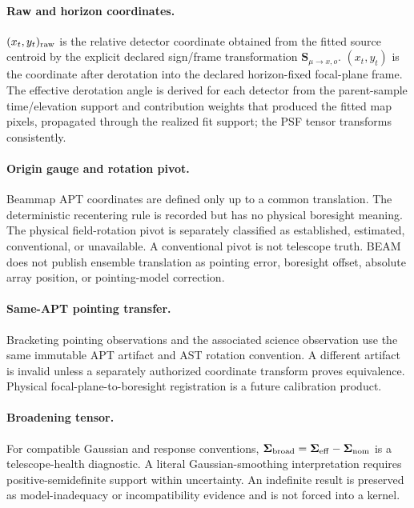 \paragraph{Raw and horizon coordinates.} $(x_t,y_t)_{\rm raw}$ is the relative
detector coordinate obtained from the fitted source centroid by the explicit
declared sign/frame transformation
$\mathbf S_{\mu\rightarrow x,o}$. $(x_t,y_t)$ is the coordinate after
derotation into the declared horizon-fixed focal-plane frame. The effective
derotation angle is derived for each detector from the parent-sample
time/elevation support and contribution weights that produced the fitted map
pixels, propagated through the realized fit support; the PSF tensor transforms
consistently.

\paragraph{Origin gauge and rotation pivot.} Beammap APT coordinates are
defined only up to a common translation. The deterministic recentering rule is
recorded but has no physical boresight meaning. The physical field-rotation
pivot is separately classified as established, estimated, conventional, or
unavailable. A conventional pivot is not telescope truth. BEAM does not
publish ensemble translation as pointing error, boresight offset, absolute
array position, or pointing-model correction.

\paragraph{Same-APT pointing transfer.} Bracketing pointing observations and
the associated science observation use the same immutable APT artifact and AST
rotation convention. A different artifact is invalid unless a separately
authorized coordinate transform proves equivalence. Physical
focal-plane-to-boresight registration is a future calibration product.

\paragraph{Broadening tensor.} For compatible Gaussian and response
conventions, $\boldsymbol\Sigma_{\rm broad}=\boldsymbol\Sigma_{\rm eff}-
\boldsymbol\Sigma_{\rm nom}$ is a telescope-health diagnostic. A literal
Gaussian-smoothing interpretation requires positive-semidefinite support
within uncertainty. An indefinite result is preserved as model-inadequacy or
incompatibility evidence and is not forced into a kernel.

